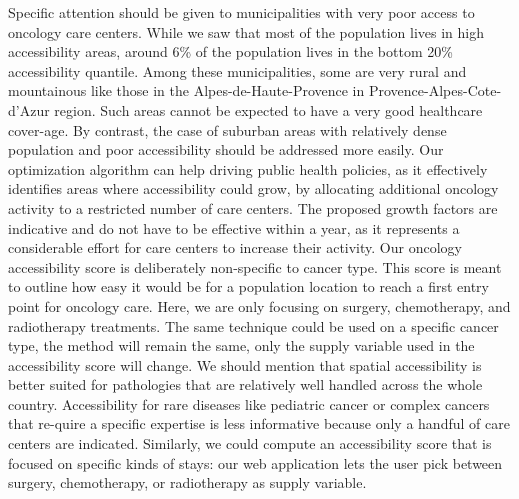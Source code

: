 Specific attention should be given to municipalities with very poor access to oncology care centers. While we saw that most of the population lives in high accessibility areas, around 6\% of the population lives in the bottom 20\% accessibility quantile. Among these municipalities, some are very rural and mountainous like those in the Alpes-de-Haute-Provence in Provence-Alpes-Cote-d'Azur region. Such areas cannot be expected to have a very good healthcare cover-age. By contrast, the case of suburban areas with relatively dense population and poor accessibility should be addressed more easily. Our optimization algorithm can help driving public health policies, as it effectively identifies areas where accessibility could grow, by allocating additional oncology activity to a restricted number of care centers. The proposed growth factors are indicative and do not have to be effective within a year, as it represents a considerable effort for care centers to increase their activity.
Our oncology accessibility score is deliberately non-specific to cancer type. This score is meant to outline how easy it would be for a population location to reach a first entry point for oncology care. Here, we are only focusing on surgery, chemotherapy, and radiotherapy treatments. The same technique could be used on a specific cancer type, the method will remain the same, only the supply variable used in the accessibility score will change. We should mention that spatial accessibility is better suited for pathologies that are relatively well handled across the whole country. Accessibility for rare diseases like pediatric cancer or complex cancers that re-quire a specific expertise is less informative because only a handful of care centers are indicated.
Similarly, we could compute an accessibility score that is focused on specific kinds of stays: our web application lets the user pick between surgery, chemotherapy, or radiotherapy as supply variable.
